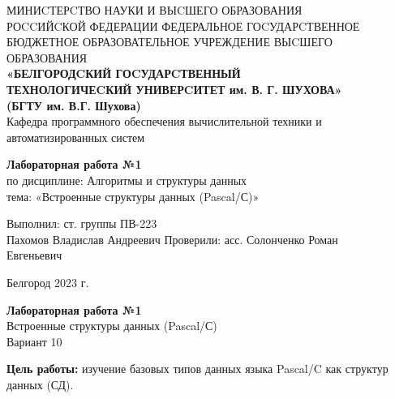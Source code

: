 \documentclass[a4paper,14pt]{extarticle}
\newcommand\textbox[1]{
	\parbox{.45\textwidth}{#1}
}
\begin{document}
\begin{center}
	\small{
		МИНИCТЕРCТВО НАУКИ И ВЫCШЕГО ОБРАЗОВАНИЯ \\РОCCИЙCКОЙ ФЕДЕРАЦИИ
		\bigbreak
		ФЕДЕРАЛЬНОЕ ГОCУДАРCТВЕННОЕ БЮДЖЕТНОЕ ОБРАЗОВАТЕЛЬНОЕ УЧРЕЖДЕНИЕ ВЫCШЕГО ОБРАЗОВАНИЯ \\
		\bigbreak
		\textbf{«БЕЛГОРОДCКИЙ ГОCУДАРCТВЕННЫЙ \\ТЕХНОЛОГИЧЕCКИЙ УНИВЕРCИТЕТ им. В. Г. ШУХОВА»\\ (БГТУ им. В.Г. Шухова)} \\
		\bigbreak
		Кафедра программного обеспечения вычислительной техники и автоматизированных систем\\}
\end{center}

\vfill
\begin{center}
	\large{
		\textbf{
			Лабораторная работа №1}}\\
	\normalsize{
		по дисциплине: Алгоритмы и структуры данных \\
		тема: «Встроенные структуры данных (Pascal/С)»}
\end{center}
\vfill
\hfill\textbox{
	Выполнил: ст. группы ПВ-223\\Пахомов Владислав Андреевич
	\bigbreak
	Проверили: асс. Солонченко Роман\\Евгеньевич
}
\vfill\begin{center}
	Белгород 2023 г.
\end{center}

\newpage

\begin{center}
	\textbf{Лабораторная работа №1}\\
	Встроенные структуры данных (Pascal/С)\\
	Вариант 10
\end{center}
\textbf{Цель работы: }изучение базовых типов данных языка Pascal/C как структур данных (СД).
\end{document}
